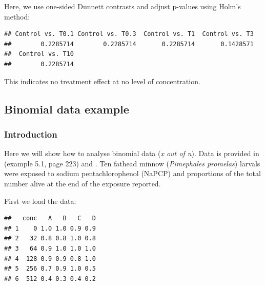 Here, we use one-sided Dunnett contrasts and adjust p-values using Holm's method:
\begin{knitrout}
\color{fgcolor}\small\begin{kframe}
\begin{alltt}
\hlstd{(} \hlopt{$}  \hlopt{$}
                     \hlstd{=} \hlstd{,}  \hlstd{=} \hlstd{,}  \hlstd{=} \hlstd{)}
\end{alltt}
\begin{verbatim}
## Control vs. T0.1 Control vs. T0.3  Control vs. T1  Control vs. T3 
##        0.2285714        0.2285714       0.2285714       0.1428571 
##  Control vs. T10 
##        0.2285714
\end{verbatim}
\end{kframe}
\end{knitrout}
This indicates no treatment effect at no level of concentration.



\clearpage
\subsection{Binomial data example}
\subsubsection{Introduction}
Here we will show how to analyse binomial data (\emph{x out of n}). 
Data is provided in \citet{newman_quantitative_2012} (example 5.1, page 223) and \citet{epa_methods_2002}.
Ten fathead minnow (\textit{Pimephales promelas}) larvals were exposed to sodium pentachlorophenol (NaPCP) and proportions of the total number alive at the end of the exposure reported.

First we load the data:
\begin{knitrout}
\color{fgcolor}\small\begin{kframe}
\begin{alltt}
 \hlkwb{<-} \hlstd{(} \hlstd{=} \hlstd{,}  \hlstd{=} \hlstd{)}
\end{alltt}
\begin{verbatim}
##   conc   A   B   C   D
## 1    0 1.0 1.0 0.9 0.9
## 2   32 0.8 0.8 1.0 0.8
## 3   64 0.9 1.0 1.0 1.0
## 4  128 0.9 0.9 0.8 1.0
## 5  256 0.7 0.9 1.0 0.5
## 6  512 0.4 0.3 0.4 0.2
\end{verbatim}
\end{kframe}
\end{knitrout}

